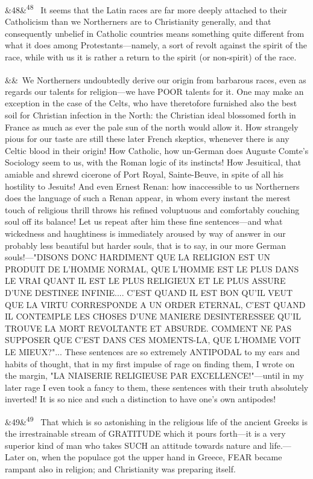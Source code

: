 \documentclass[12pt]{article}
\newcommand{\para}[1][]{\par\noindent\ifx&#1&\else\textsuperscript{\footnotesize #1}~\fi}
\begin{document}
\para[48] It seems that the Latin races are far more deeply attached to their Catholicism than we Northerners are to Christianity generally, and that consequently unbelief in Catholic countries means something quite different from what it does among Protestants---namely, a sort of revolt against the spirit of the race, while with us it is rather a return to the spirit (or non-spirit) of the race.

\para We Northerners undoubtedly derive our origin from barbarous races, even as regards our talents for religion---we have POOR talents for it. One may make an exception in the case of the Celts, who have theretofore furnished also the best soil for Christian infection in the North: the Christian ideal blossomed forth in France as much as ever the pale sun of the north would allow it. How strangely pious for our taste are still these later French skeptics, whenever there is any Celtic blood in their origin! How Catholic, how un-German does Auguste Comte's Sociology seem to us, with the Roman logic of its instincts! How Jesuitical, that amiable and shrewd cicerone of Port Royal, Sainte-Beuve, in spite of all his hostility to Jesuits! And even Ernest Renan: how inaccessible to us Northerners does the language of such a Renan appear, in whom every instant the merest touch of religious thrill throws his refined voluptuous and comfortably couching soul off its balance! Let us repeat after him these fine sentences---and what wickedness and haughtiness is immediately aroused by way of answer in our probably less beautiful but harder souls, that is to say, in our more German souls!---"DISONS DONC HARDIMENT QUE LA RELIGION EST UN PRODUIT DE L'HOMME NORMAL, QUE L'HOMME EST LE PLUS DANS LE VRAI QUANT IL EST LE PLUS RELIGIEUX ET LE PLUS ASSURE D'UNE DESTINEE INFINIE.... C'EST QUAND IL EST BON QU'IL VEUT QUE LA VIRTU CORRESPONDE A UN ORDER ETERNAL, C'EST QUAND IL CONTEMPLE LES CHOSES D'UNE MANIERE DESINTERESSEE QU'IL TROUVE LA MORT REVOLTANTE ET ABSURDE. COMMENT NE PAS SUPPOSER QUE C'EST DANS CES MOMENTS-LA, QUE L'HOMME VOIT LE MIEUX?"... These sentences are so extremely ANTIPODAL to my ears and habits of thought, that in my first impulse of rage on finding them, I wrote on the margin, "LA NIAISERIE RELIGIEUSE PAR EXCELLENCE!"---until in my later rage I even took a fancy to them, these sentences with their truth absolutely inverted! It is so nice and such a distinction to have one's own antipodes!

\para[49] That which is so astonishing in the religious life of the ancient Greeks is the irrestrainable stream of GRATITUDE which it pours forth---it is a very superior kind of man who takes SUCH an attitude towards nature and life.---Later on, when the populace got the upper hand in Greece, FEAR became rampant also in religion; and Christianity was preparing itself.
\end{document}
